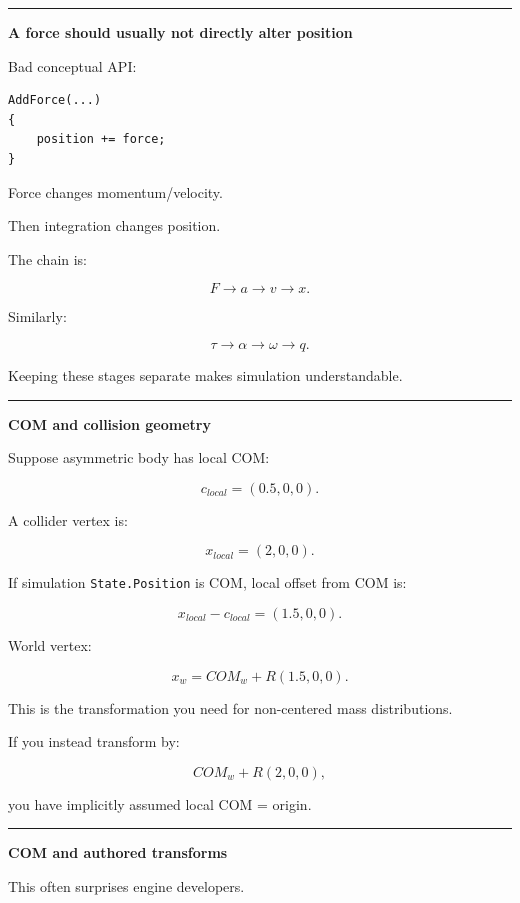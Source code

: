 \begin{center}\rule{0.5\linewidth}{0.5pt}\end{center}

\textbf{A force should usually not directly alter position}

Bad conceptual API:

\begin{verbatim}
AddForce(...)
{
    position += force;
}
\end{verbatim}

Force changes momentum/velocity.

Then integration changes position.

The chain is:

\[
F
\rightarrow
a
\rightarrow
v
\rightarrow
x.
\]

Similarly:

\[
\tau
\rightarrow
\alpha
\rightarrow
\omega
\rightarrow
q.
\]

Keeping these stages separate makes simulation understandable.

\begin{center}\rule{0.5\linewidth}{0.5pt}\end{center}

\textbf{COM and collision geometry}

Suppose asymmetric body has local COM:

\[
c_{local}=(0.5,0,0).
\]

A collider vertex is:

\[
x_{local}=(2,0,0).
\]

If simulation \texttt{State.Position} is COM, local offset from COM is:

\[
x_{local}-c_{local}
=
(1.5,0,0).
\]

World vertex:

\[
x_w
=
COM_w+
R(1.5,0,0).
\]

This is the transformation you need for non-centered mass distributions.

If you instead transform by:

\[
COM_w+R(2,0,0),
\]

you have implicitly assumed local COM = origin.

\begin{center}\rule{0.5\linewidth}{0.5pt}\end{center}

\textbf{COM and authored transforms}

This often surprises engine developers.

